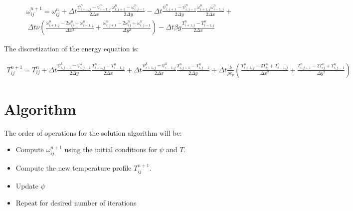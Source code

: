 \documentclass[journal]{new-aiaa}
\begin{document}
\begin{equation}
\begin{aligned}
\label{equation:omegadiscrete}
\omega^{n+1}_{ij} =\omega^{n}_{ij} +\Delta t\frac{\psi^{n}_{i+1,j} -\psi^{n}_{i-1,j} }{2\Delta x} \frac{\omega^{n}_{i,j+1} -\omega^{n}_{i,j-1} }{2\Delta y} -\Delta t\frac{\psi^{n}_{i,j+1} -\psi^{n}_{i,j-1} }{2\Delta y} \frac{\omega^{n}_{i+1,j} \omega^{n}_{i-1,j} }{2\Delta x} + \\ \
\Delta t\nu \left( \frac{\omega^{n}_{i+1,j} -2\omega^{n}_{ij} +\omega^{n}_{i-1,j} }{\Delta x^{2}} +\frac{\omega^{n}_{i,j+1} -2\omega^{n}_{ij} +\omega^{n}_{i,j-1} }{\Delta y^{2}} \right)  -\Delta t\beta g\frac{T^{n}_{i+1,j}-T^{n}_{i-1,j}}{2\Delta x} 
\end{aligned}
\end{equation}

The discretization of the energy equation is:

\begin{equation}
\begin{aligned}
\label{equation:omegadiscrete}
T^{n+1}_{ij}=T^n_{ij}+\Delta t\frac{\psi^{k}_{i,j+1} -\psi^{k}_{i,j-1} }{2\Delta y} \frac{T^{n}_{i+1,j}-T^{n}_{i-1,j}}{2\Delta x} +\Delta t \frac{\psi^{k}_{i+1,j} -\psi^{k}_{i-1,j} }{2\Delta x} \frac{T^{n}_{i,j+1}-T^{n}_{i,j-1}}{2\Delta y} +\Delta t\frac{k}{\rho c_{p}} \left(\frac{T^{n}_{i+1,j}-2T^{n}_{ij}+T^{n}_{i-1,j}}{\Delta x^{2}} +\frac{T^{n}_{i,j+1}-2T^{n}_{ij}+T^{n}_{i,j-1}}{\Delta y^{2}} \right)
\end{aligned}
\end{equation}

\section{Algorithm}
The order of operations for the solution algorithm will be:
\begin{itemize}
\item Compute $\omega^{n+1}_{ij}$ using the initial conditions for $\psi$ and $T$.
\item Compute the new temperature profile $T^{n+1}_{ij}$.
\item Update $\psi$
\item Repeat for desired number of iterations
\end{itemize}
\end{document}
